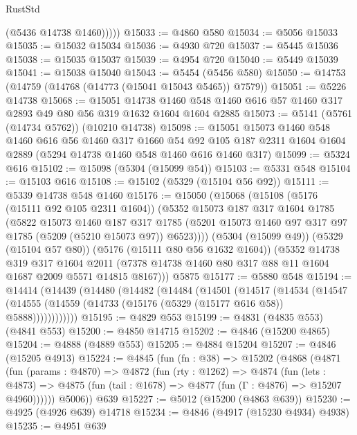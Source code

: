 \begin{lexlean}{RustStd}
\begin{coremodule}
            (@5436 @14738 @1460)))))
@15033 := @4860 @580
@15034 := @5056 @15033
@15035 := @15032 @15034
@15036 := @4930 @720
@15037 := @5445 @15036
@15038 := @15035 @15037
@15039 := @4954 @720
@15040 := @5449 @15039
@15041 := @15038 @15040
@15043 := @5454 (@5456 @580)
@15050 := @14753 (@14759 (@14768 (@14773 (@15041 @15043 @5465)) @7579))
@15051 := @5226 @14738
@15068 := @15051
    @14738
    @1460
    @548
    @1460
    @616
    @57
    @1460
    @317
    @2893
    @49
    @80
    @56
    @319
    @1632
    @1604
    @1604
    @2885
@15073 := @5141 (@5761 (@14734 @5762)) (@10210 @14738)
@15098 := @15051
    @15073
    @1460
    @548
    @1460
    @616
    @56
    @1460
    @317
    @1660
    @54
    @92
    @105
    @187
    @2311
    @1604
    @1604
    @2889
    (@5294 @14738 @1460 @548 @1460 @616 @1460 @317)
@15099 := @5324 @616
@15102 := @15098 (@5304 (@15099 @54))
@15103 := @5331 @548
@15104 := @15103 @616
@15108 := @15102 (@5329 (@15104 @56 @92))
@15111 := @5339 @14738 @548 @1460
@15176 := @15050
    (@15068
      (@15108
        (@5176 (@15111 @92 @105 @2311 @1604))
        (@5352
          @15073
          @187
          @317
          @1604
          @1785
          (@5822
            @15073
            @1460
            @187
            @317
            @1785
            (@5201 @15073 @1460 @97 @317 @97 @1785 (@5209 (@5210 @15073 @97)) @6523))))
      (@5304 (@15099 @49))
      (@5329 (@15104 @57 @80))
      (@5176 (@15111 @80 @56 @1632 @1604))
      (@5352
        @14738
        @319
        @317
        @1604
        @2011
        (@7378 @14738 @1460 @80 @317 @88 @11 @1604 @1687 @2009 @5571 @14815 @8167)))
    @5875
@15177 := @5880 @548
@15194 := @14414
    (@14439
      (@14480
        (@14482
          (@14484
            (@14501
              (@14517
                (@14534
                  (@14547
                    (@14555 (@14559 (@14733 (@15176 (@5329 (@15177 @616 @58)) @5888))))))))))))
@15195 := @4829 @553
@15199 := @4831 (@4835 @553) (@4841 @553)
@15200 := @4850 @14715
@15202 := @4846 (@15200 @4865)
@15204 := @4888 (@4889 @553)
@15205 := @4884 @15204
@15207 := @4846 (@15205 @4913)
@15224 := @4845
    (fun (fn : @38) =>
    @15202
      (@4868
        (@4871
          (fun (params : @4870) =>
          @4872
            (fun (rty : @1262) =>
            @4874
              (fun (lets : @4873) =>
              @4875 (fun (tail : @1678) => @4877 (fun (Γ : @4876) => @15207 @4960))))))
        @5006))
    @639
@15227 := @5012 (@15200 (@4863 @639))
@15230 := @4925 (@4926 @639) @14718
@15234 := @4846 (@4917 (@15230 @4934) @4938)
@15235 := @4951 @639

\end{coremodule}
\end{lexlean}
